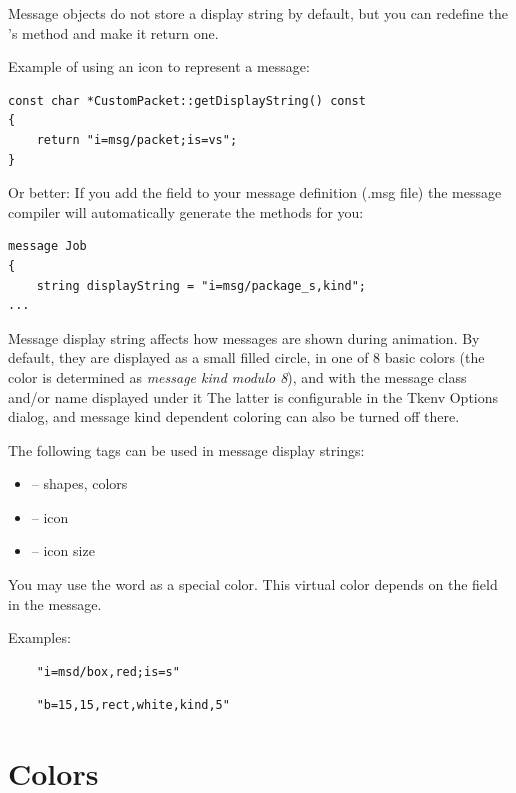 Message objects do not store a display string by default, but you can redefine
the 's  method and make it return
one.

Example of using an icon to represent a message:
\begin{verbatim}
const char *CustomPacket::getDisplayString() const
{
    return "i=msg/packet;is=vs";
}
\end{verbatim}

Or better: If you add the field  to your message 
definition (.msg file) the message compiler will automatically generate 
the  methods for you:

\begin{verbatim}
message Job
{
    string displayString = "i=msg/package_s,kind";
...
\end{verbatim}

Message display string affects how messages are shown during animation.
By default, they are displayed as a small filled circle, in one of
8 basic colors (the color is determined as \textit{message kind modulo 8}),
and with the message class and/or name displayed under it
The latter is configurable in the Tkenv Options dialog, and message kind
dependent coloring can also be turned off there.

The following tags can be used in message display strings:
\begin{itemize}
  \item{ -- shapes, colors}
  \item{ -- icon}
  \item{ -- icon size}
\end{itemize}

\begin{note}
   You may use the word  as a special color. This virtual color depends on 
   the  field in the message.
\end{note}

Examples:
\begin{verbatim}
    "i=msd/box,red;is=s"
\end{verbatim}

\begin{verbatim}
    "b=15,15,rect,white,kind,5"
\end{verbatim}



\section{Colors}
\label{sec:ch-graphics:colors}

